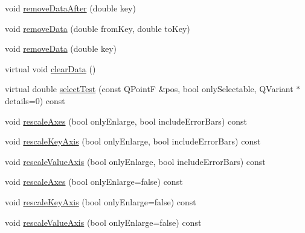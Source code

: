 \begin{DoxyCompactItemize}
\item 
void \mbox{\hyperlink{class_q_c_p_graph_ae42d645ef617cfc75fc0df58e62c522a}{remove\+Data\+After}} (double key)
\item 
void \mbox{\hyperlink{class_q_c_p_graph_a4a0fde50b7db9db0a85b5c5b6b10098f}{remove\+Data}} (double from\+Key, double to\+Key)
\item 
void \mbox{\hyperlink{class_q_c_p_graph_a4a706020b4318f118381648ef18aca3f}{remove\+Data}} (double key)
\item 
virtual void \mbox{\hyperlink{class_q_c_p_graph_ad4e94a4e44e5e76fbec81a72a977157d}{clear\+Data}} ()
\item 
virtual double \mbox{\hyperlink{class_q_c_p_graph_a36011c34aca4f7a477de25961e2f6c13}{select\+Test}} (const Q\+PointF \&pos, bool only\+Selectable, Q\+Variant $\ast$details=0) const
\item 
void \mbox{\hyperlink{class_q_c_p_graph_a9c3909d6116e9d03978f057d41174e6a}{rescale\+Axes}} (bool only\+Enlarge, bool include\+Error\+Bars) const
\item 
void \mbox{\hyperlink{class_q_c_p_graph_a051fb77b459ba1ae8d65552c67f45e94}{rescale\+Key\+Axis}} (bool only\+Enlarge, bool include\+Error\+Bars) const
\item 
void \mbox{\hyperlink{class_q_c_p_graph_a9e0e620a56932c4df80a3762c2f93608}{rescale\+Value\+Axis}} (bool only\+Enlarge, bool include\+Error\+Bars) const
\item 
void \mbox{\hyperlink{class_q_c_p_graph_a1491c4a606bccd2d09e65e11b79eb882}{rescale\+Axes}} (bool only\+Enlarge=false) const
\item 
void \mbox{\hyperlink{class_q_c_p_graph_ae96b83c961e257da116c6acf9c7da308}{rescale\+Key\+Axis}} (bool only\+Enlarge=false) const
\item 
void \mbox{\hyperlink{class_q_c_p_graph_aa1e408bb2d13999150c3f7f8a8579ca9}{rescale\+Value\+Axis}} (bool only\+Enlarge=false) const
\end{DoxyCompactItemize}
